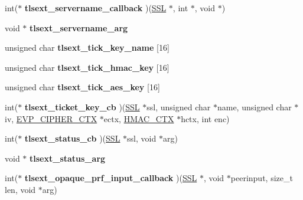 \begin{DoxyCompactItemize}
\item 
\mbox{\label{structssl__ctx__st_aa6c57ade4e374ba2092309192e700b45}} 
int($\ast$ {\bfseries tlsext\+\_\+servername\+\_\+callback} )(\hyperlink{structssl__st}{S\+SL} $\ast$, int $\ast$, void $\ast$)
\item 
\mbox{\label{structssl__ctx__st_a2ab57baeccaab0b8d7ecc9c478f3ee14}} 
void $\ast$ {\bfseries tlsext\+\_\+servername\+\_\+arg}
\item 
\mbox{\label{structssl__ctx__st_a7f5cf468448dbbe1ae706c152d4abee5}} 
unsigned char {\bfseries tlsext\+\_\+tick\+\_\+key\+\_\+name} \mbox{[}16\mbox{]}
\item 
\mbox{\label{structssl__ctx__st_a3bbed4399466da935affa8b11dc37967}} 
unsigned char {\bfseries tlsext\+\_\+tick\+\_\+hmac\+\_\+key} \mbox{[}16\mbox{]}
\item 
\mbox{\label{structssl__ctx__st_ad6776ce4d46e74ca3580f34365c53b41}} 
unsigned char {\bfseries tlsext\+\_\+tick\+\_\+aes\+\_\+key} \mbox{[}16\mbox{]}
\item 
\mbox{\label{structssl__ctx__st_a87b05e20d2f45baa5f9a6ea0cd2d08c5}} 
int($\ast$ {\bfseries tlsext\+\_\+ticket\+\_\+key\+\_\+cb} )(\hyperlink{structssl__st}{S\+SL} $\ast$ssl, unsigned char $\ast$name, unsigned char $\ast$iv, \hyperlink{structevp__cipher__ctx__st}{E\+V\+P\+\_\+\+C\+I\+P\+H\+E\+R\+\_\+\+C\+TX} $\ast$ectx, \hyperlink{structhmac__ctx__st}{H\+M\+A\+C\+\_\+\+C\+TX} $\ast$hctx, int enc)
\item 
\mbox{\label{structssl__ctx__st_a950b7e9a873dcdd4af6363290e35d484}} 
int($\ast$ {\bfseries tlsext\+\_\+status\+\_\+cb} )(\hyperlink{structssl__st}{S\+SL} $\ast$ssl, void $\ast$arg)
\item 
\mbox{\label{structssl__ctx__st_a34c025b8e62d9ade63d51808d9271192}} 
void $\ast$ {\bfseries tlsext\+\_\+status\+\_\+arg}
\item 
\mbox{\label{structssl__ctx__st_a93fda87cb1a383657cbc973886b5a4c7}} 
int($\ast$ {\bfseries tlsext\+\_\+opaque\+\_\+prf\+\_\+input\+\_\+callback} )(\hyperlink{structssl__st}{S\+SL} $\ast$, void $\ast$peerinput, size\+\_\+t len, void $\ast$arg)

\end{DoxyCompactItemize}
